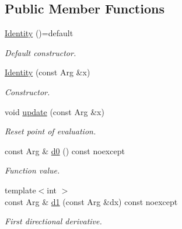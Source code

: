 \subsection*{Public Member Functions}
\begin{DoxyCompactItemize}
\item 
\hypertarget{structRFFGen_1_1Identity_a8b78693b14060a66fe32e8a15df1873a}{\hyperlink{structRFFGen_1_1Identity_a8b78693b14060a66fe32e8a15df1873a}{Identity} ()=default}\label{structRFFGen_1_1Identity_a8b78693b14060a66fe32e8a15df1873a}

\begin{DoxyCompactList}\small\item\em Default constructor. \end{DoxyCompactList}\item 
\hyperlink{structRFFGen_1_1Identity_ad1206bbe037c72a77aa90119f228f9e2}{Identity} (const Arg \&x)
\begin{DoxyCompactList}\small\item\em Constructor. \end{DoxyCompactList}\item 
\hypertarget{structRFFGen_1_1Identity_a0ddfb34c7d8f2edb9648dedf046164c8}{void \hyperlink{structRFFGen_1_1Identity_a0ddfb34c7d8f2edb9648dedf046164c8}{update} (const Arg \&x)}\label{structRFFGen_1_1Identity_a0ddfb34c7d8f2edb9648dedf046164c8}

\begin{DoxyCompactList}\small\item\em Reset point of evaluation. \end{DoxyCompactList}\item 
\hypertarget{structRFFGen_1_1Identity_a41c728eda635f547da2a0b697876ca63}{const Arg \& \hyperlink{structRFFGen_1_1Identity_a41c728eda635f547da2a0b697876ca63}{d0} () const noexcept}\label{structRFFGen_1_1Identity_a41c728eda635f547da2a0b697876ca63}

\begin{DoxyCompactList}\small\item\em Function value. \end{DoxyCompactList}\item 
\hypertarget{structRFFGen_1_1Identity_a0a2fba6a1d3326df7de1f329e20dd557}{{\footnotesize template$<$int $>$ }\\const Arg \& \hyperlink{structRFFGen_1_1Identity_a0a2fba6a1d3326df7de1f329e20dd557}{d1} (const Arg \&dx) const noexcept}\label{structRFFGen_1_1Identity_a0a2fba6a1d3326df7de1f329e20dd557}

\begin{DoxyCompactList}\small\item\em First directional derivative. \end{DoxyCompactList}\end{DoxyCompactItemize}


